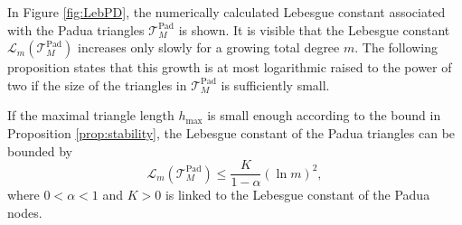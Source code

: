 \documentclass{svjour3}
\begin{document}
In Figure \ref{fig:LebPD}, the numerically calculated Lebesgue constant associated with the Padua triangles $\mathcal{T}_M^{\mathrm{Pad}}$ is shown. It is visible that the Lebesgue constant $\mathscr{L}_m \left(\mathcal{T}_M^{\mathrm{Pad}} \right)$ increases only slowly for a growing total degree $m$. The following proposition states that this growth is at most logarithmic raised to the power of two if the size of the triangles in $\mathcal{T}_M^{\mathrm{Pad}}$ is sufficiently small.  

\begin{proposition} \label{prop:stability2}  
	If the maximal triangle length $h_{\max}$ is small enough according to the bound in Proposition \ref{prop:stability}, the Lebesgue constant of the Padua triangles can be bounded by
	$$ \mathscr{L}_m \left( \mathcal{T}_M^{\mathrm{Pad}} \right) \leq \frac{K}{1-\alpha} \left(\ln m\right)^2,$$
	where $0 < \alpha < 1$ and $K>0$ is linked to the Lebesgue constant of the Padua nodes.  
\end{proposition}
\end{document}
